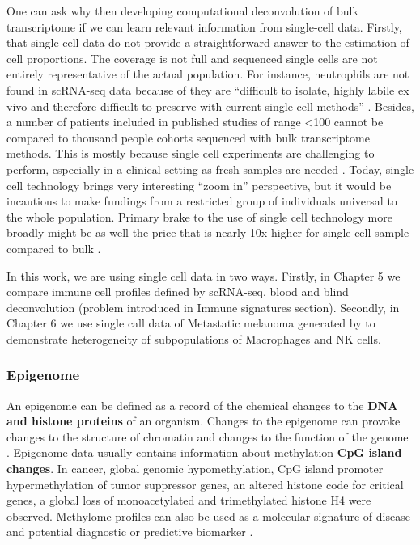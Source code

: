 \documentclass[12pt,]{book}
\theoremstyle{definition}
\theoremstyle{definition}
\theoremstyle{definition}
\theoremstyle{remark}
\begin{document}
One can ask why then developing computational deconvolution of bulk
transcriptome if we can learn relevant information from single-cell
data. Firstly, that single cell data do not provide a straightforward
answer to the estimation of cell proportions. The coverage is not full
and sequenced single cells are not entirely representative of the actual
population. For instance, neutrophils are not found in scRNA-seq data
because of they are ``difficult to isolate, highly labile ex vivo and
therefore difficult to preserve with current single-cell methods''
\citep{Schelker2017}. Besides, a number of patients included in
published studies of range \textless{}100 cannot be compared to thousand
people cohorts sequenced with bulk transcriptome methods. This is mostly
because single cell experiments are challenging to perform, especially
in a clinical setting as fresh samples are needed \citep{Schelker2017}.
Today, single cell technology brings very interesting ``zoom in''
perspective, but it would be incautious to make fundings from a
restricted group of individuals universal to the whole population.
Primary brake to the use of single cell technology more broadly might be
as well the price that is nearly 10x higher for single cell sample
compared to bulk \citep{Cedar2018}.

In this work, we are using single cell data in two ways. Firstly, in
Chapter 5 we compare immune cell profiles defined by scRNA-seq, blood
and blind deconvolution (problem introduced in Immune signatures
section). Secondly, in Chapter 6 we use single call data of Metastatic
melanoma generated by \citet{Tirosh2016} to demonstrate heterogeneity of
subpopulations of Macrophages and NK cells.

\hypertarget{epi}{%
\subsubsection{Epigenome}\label{epi}}

An epigenome can be defined as a record of the chemical changes to the
\textbf{DNA and histone proteins} of an organism. Changes to the
epigenome can provoke changes to the structure of chromatin and changes
to the function of the genome \citep{Bernstein2007}. Epigenome data
usually contains information about methylation \textbf{CpG island
changes}. In cancer, global genomic hypomethylation, CpG island promoter
hypermethylation of tumor suppressor genes, an altered histone code for
critical genes, a global loss of monoacetylated and trimethylated
histone H4 were observed. Methylome profiles can also be used as a
molecular signature of disease and potential diagnostic or predictive
biomarker \citep{Jeschke2017}.
\end{document}
